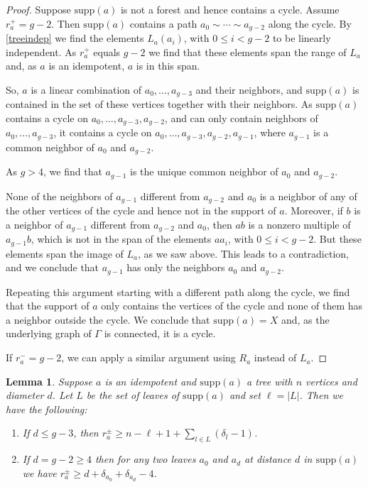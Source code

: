 \documentclass[oneside,a4paper]{amsart} %
\newtheorem{lemma}[proposition]{Lemma}
\theoremstyle{definition}
\begin{document}
\begin{proof}
Suppose $\mathrm{supp}(a)$ is not a forest and hence contains a cycle.
Assume $r^+_a=g-2$.
Then $\mathrm{supp}(a)$ contains a path $a_0\sim\cdots \sim a_{g-2}$ along the cycle.
By \cref{treeindep}  we find  the elements 
$L_a(a_i)$, with $0\leq i< g-2$ to be  linearly independent.
As $r^+_a$ equals $g-2$ we find that these elements span the range of $L_a$ and, as $a$ is an idempotent,  $a$ is in this span.

So, $a$ is a linear combination of $a_0,\dots, a_{g-3}$ and their neighbors, and $\mathrm{supp}(a)$
is contained in the set of these vertices together with their neighbors.
As $\mathrm{supp}(a)$ contains a cycle on $a_0,\dots, a_{g-3}, a_{g-2}$, and can only contain neighbors of $a_0,\dots, a_{g-3}$,
it contains a cycle on $a_0,\dots, a_{g-3}, a_{g-2}, a_{g-1}$, where $a_{g-1}$ is a common neighbor of $a_0$ and $a_{g-2}$.

As $g>4$, we find that $a_{g-1}$ is the unique common neighbor of $a_0$ and $a_{g-2}$.

None of the neighbors of $a_{g-1}$ different from $a_{g-2}$ and $a_0$ is a neighbor of any of the other vertices
of the cycle and hence not in the support of $a$.
Moreover, if $b$ is a neighbor of $a_{g-1}$ different from $a_{g-2}$ and $a_0$, then 
$ab$ is a nonzero multiple of $a_{g-1}b$, which is not in the span of the elements $aa_i$, with $0\leq i<g-2$.
But these elements  span the image of $L_a$, as we saw above.
This leads to a contradiction, and we conclude that $a_{g-1}$ has only the neighbors $a_0$ and $a_{g-2}$.

Repeating this argument starting with a different path along the cycle, we find that
the support of $a$ only contains the vertices of the cycle and none of them has a neighbor outside the cycle.
We conclude that $\mathrm{supp}(a)=X$ and, as the underlying graph of $\Gamma$ is connected, it is a cycle.

If $r^-_a=g-2$, we can apply a similar argument using $R_a$ instead of $L_a$. 
\end{proof}





\begin{lemma}\label{leaves}
Suppose $a$ is an idempotent
and $\mathrm{supp}(a)$ a tree with $n$ vertices and diameter $d$.
Let $L$ be the set of leaves of $\mathrm{supp}(a)$ and set $\ell=|L|$.
Then we have the following:
\begin{enumerate}
\item 
If  $d\leq g-3$, then $r^\pm_a\geq n-\ell+1+\displaystyle\sum_{l\in L}(\delta_l-1)$.
\item 
If $d=g-2\geq 4$  then for any two leaves $a_0$ and $a_d$ at distance $d$ in $\mathrm{supp}(a)$ we have  $r^\pm_a\geq d+\delta_{a_0}+\delta_{a_d}-4$.  
\end{enumerate}
\end{lemma}
\end{document}
